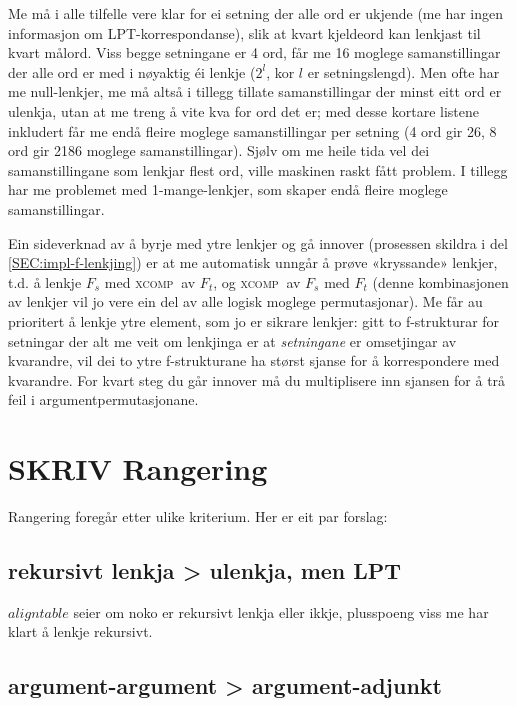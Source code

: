 \documentclass[11pt,a4paper,oneside,draft]{book}
\newcommand{\F}[2]{\textsc{#1}\ensuremath{_{#2}}}
\newcommand{\XCOMPs}{\F{xcomp~}{}}
\begin{document}
Me må i alle tilfelle vere klar for ei setning der alle ord er ukjende
(me har ingen informasjon om LPT-korrespondanse), slik at kvart
kjeldeord kan lenkjast til kvart målord. Viss begge setningane er 4 ord,
får me 16 moglege samanstillingar der alle ord er med i nøyaktig éi
lenkje ($2^l$, kor $l$ er setningslengd). Men ofte har me
null-lenkjer, me må altså i tillegg tillate samanstillingar der minst
eitt ord er ulenkja, utan at me treng å vite kva for ord det er; med
desse kortare listene inkludert får me endå fleire moglege
samanstillingar per setning (4 ord gir 26, 8 ord gir 2186 moglege
samanstillingar). Sjølv om me heile tida vel dei samanstillingane som
lenkjar flest ord, ville maskinen raskt fått problem. I tillegg har me
problemet med 1-mange-lenkjer, som skaper endå fleire moglege
samanstillingar.

Ein sideverknad av å byrje med ytre lenkjer og gå innover (prosessen
skildra i del \ref{SEC:impl-f-lenkjing}) er at me automatisk unngår å
prøve «kryssande» lenkjer, t.d. å lenkje $F_s$ med \XCOMPs av $F_t$, og
\XCOMPs av $F_s$ med $F_t$ (denne kombinasjonen av lenkjer vil jo vere
ein del av alle logisk moglege permutasjonar). Me får au prioritert å
lenkje ytre element, som jo er sikrare lenkjer: gitt to f-strukturar
for setningar der alt me veit om lenkjinga er at \emph{setningane} er
omsetjingar av kvarandre, vil dei to ytre f-strukturane ha størst
sjanse for å korrespondere med kvarandre. For kvart steg du går
innover må du multiplisere inn sjansen for å trå feil i
argumentpermutasjonane.

\section{\textbf{SKRIV} Rangering}
\label{sec-4.2}

\label{SEC:f-rangering}

Rangering foregår etter ulike kriterium. Her er eit par forslag:
\subsection{rekursivt lenkja > ulenkja, men LPT}
\label{sec-4.2.1}

    $aligntable$ seier om noko er rekursivt lenkja eller ikkje,
    plusspoeng viss me har klart å lenkje rekursivt.
\subsection{argument-argument > argument-adjunkt}
\label{sec-4.2.2}
\end{document}
